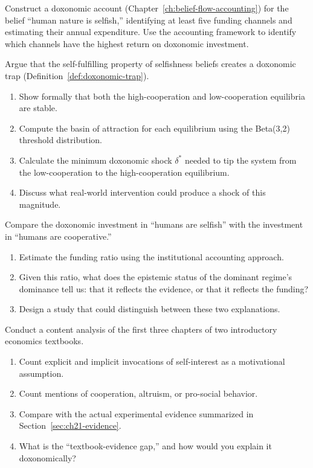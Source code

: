 \begin{exercise}
Construct a doxonomic account (Chapter~\ref{ch:belief-flow-accounting}) for the belief ``human nature is selfish,'' identifying at least five funding channels and estimating their annual expenditure.
Use the accounting framework to identify which channels have the highest return on doxonomic investment.
\end{exercise}

\begin{exercise}
Argue that the self-fulfilling property of selfishness beliefs creates a doxonomic trap (Definition~\ref{def:doxonomic-trap}).
\begin{enumerate}[nosep]
  \item Show formally that both the high-cooperation and low-cooperation equilibria are stable.
  \item Compute the basin of attraction for each equilibrium using the Beta(3,2) threshold distribution.
  \item Calculate the minimum doxonomic shock $\delta^*$ needed to tip the system from the low-cooperation to the high-cooperation equilibrium.
  \item Discuss what real-world intervention could produce a shock of this magnitude.
\end{enumerate}
\end{exercise}

\begin{exercise}
Compare the doxonomic investment in ``humans are selfish'' with the investment in ``humans are cooperative.''
\begin{enumerate}[nosep]
  \item Estimate the funding ratio using the institutional accounting approach.
  \item Given this ratio, what does the epistemic status of the dominant regime's dominance tell us: that it reflects the evidence, or that it reflects the funding?
  \item Design a study that could distinguish between these two explanations.
\end{enumerate}
\end{exercise}

\begin{exercise}
Conduct a content analysis of the first three chapters of two introductory economics textbooks.
\begin{enumerate}[nosep]
  \item Count explicit and implicit invocations of self-interest as a motivational assumption.
  \item Count mentions of cooperation, altruism, or pro-social behavior.
  \item Compare with the actual experimental evidence summarized in Section~\ref{sec:ch21-evidence}.
  \item What is the ``textbook-evidence gap,'' and how would you explain it doxonomically?
\end{enumerate}
\end{exercise}

